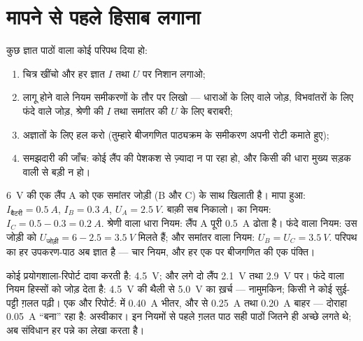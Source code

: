 \section{मापने से पहले हिसाब लगाना}

\begin{method}[चारों नियमों से परिपथ हल करना]\label{met:g8:circuit-laws:solve}
कुछ ज्ञात पाठों वाला कोई परिपथ दिया हो:
\begin{enumerate}
  \item चित्र खींचो और हर ज्ञात $I$ तथा $U$ पर निशान लगाओ;
  \item लागू होने वाले नियम समीकरणों के तौर पर लिखो --- धाराओं के लिए
         वाले जोड़, विभवांतरों के लिए फंदे वाले जोड़, श्रेणी की
        $I$ तथा समांतर की $U$ के लिए बराबरी;
  \item अज्ञातों के लिए हल करो (तुम्हारे बीजगणित पाठ्यक्रम के समीकरण
        अपनी रोटी कमाते हुए);
  \item समझदारी की जाँच: कोई लैंप  की पेशकश से ज़्यादा न पा रहा
        हो, और किसी  की धारा मुख्य सड़क वाली से बड़ी न हो।
\end{enumerate}
\end{method}

\begin{example}[हल करके दिखाया: मिला-जुला परिपथ]\label{ex:g8:circuit-laws:worked}
\qty{6}{V} की एक  लैंप A को एक समांतर जोड़ी (B और C) के साथ
 खिलाती है। मापा हुआ: $I_{\text{बैटरी}} = \qty{0.5}{A}$,
$I_B = \qty{0.3}{A}$, $U_A = \qty{2.5}{V}$. बाक़ी सब निकालो।  का
नियम: $I_C = 0.5 - 0.3 = \qty{0.2}{A}$. श्रेणी वाला धारा नियम: लैंप A
पूरी \qty{0.5}{A} ढोता है। फंदे वाला  नियम: उस जोड़ी को
$U_{\text{जोड़ी}} = 6 - 2.5 = \qty{3.5}{V}$ मिलते हैं; और समांतर वाला
 नियम: $U_B = U_C = \qty{3.5}{V}$. परिपथ का हर उपकरण-पाठ अब
ज्ञात है --- चार नियम, और हर एक पर बीजगणित की एक पंक्ति।
\end{example}

\begin{example}\label{ex:g8:circuit-laws:liedetector}
कोई प्रयोगशाला-रिपोर्ट दावा करती है:  \qty{4.5}{V}; और  लगे दो लैंप \qty{2.1}{V} तथा \qty{2.9}{V} पर। फंदे वाला नियम
हिस्सों को जोड़ देता है: \qty{4.5}{V} की थैली से \qty{5.0}{V} का
ख़र्च --- नामुमकिन; किसी ने कोई सुई-पट्टी ग़लत पढ़ी। एक और रिपोर्ट:
 में \qty{0.40}{A} भीतर, और  से \qty{0.25}{A} तथा
\qty{0.20}{A} बाहर --- दोराहा \qty{0.05}{A} ``बना'' रहा है:
अस्वीकार। इन नियमों से पहले ग़लत पाठ सही पाठों जितने ही अच्छे लगते थे;
अब संविधान हर पन्ने का लेखा करता है।
\end{example}

